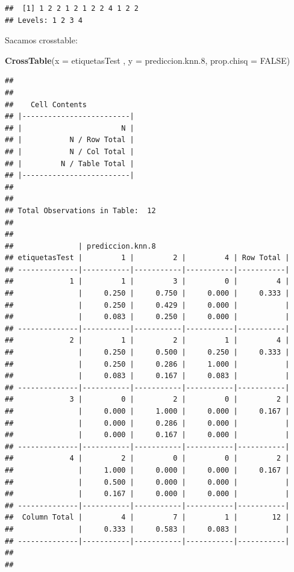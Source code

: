 \documentclass[]{article}
\newenvironment{Shaded}{\begin{snugshade}}{\end{snugshade}}
\newcommand{\KeywordTok}[1]{\textcolor[rgb]{0.13,0.29,0.53}{\textbf{#1}}}
\newcommand{\DataTypeTok}[1]{\textcolor[rgb]{0.13,0.29,0.53}{#1}}
\newcommand{\DecValTok}[1]{\textcolor[rgb]{0.00,0.00,0.81}{#1}}
\newcommand{\OtherTok}[1]{\textcolor[rgb]{0.56,0.35,0.01}{#1}}
\newcommand{\NormalTok}[1]{#1}
\begin{document}
\begin{verbatim}
##  [1] 1 2 2 1 2 1 2 2 4 1 2 2
## Levels: 1 2 3 4
\end{verbatim}

Sacamos crosstable:

\begin{Shaded}
\begin{Highlighting}[]
\KeywordTok{CrossTable}\NormalTok{(}\DataTypeTok{x =}\NormalTok{ etiquetasTest , }\DataTypeTok{y =}\NormalTok{ prediccion.knn.}\DecValTok{8}\NormalTok{, }\DataTypeTok{prop.chisq =} \OtherTok{FALSE}\NormalTok{)}
\end{Highlighting}
\end{Shaded}

\begin{verbatim}
## 
##  
##    Cell Contents
## |-------------------------|
## |                       N |
## |           N / Row Total |
## |           N / Col Total |
## |         N / Table Total |
## |-------------------------|
## 
##  
## Total Observations in Table:  12 
## 
##  
##               | prediccion.knn.8 
## etiquetasTest |         1 |         2 |         4 | Row Total | 
## --------------|-----------|-----------|-----------|-----------|
##             1 |         1 |         3 |         0 |         4 | 
##               |     0.250 |     0.750 |     0.000 |     0.333 | 
##               |     0.250 |     0.429 |     0.000 |           | 
##               |     0.083 |     0.250 |     0.000 |           | 
## --------------|-----------|-----------|-----------|-----------|
##             2 |         1 |         2 |         1 |         4 | 
##               |     0.250 |     0.500 |     0.250 |     0.333 | 
##               |     0.250 |     0.286 |     1.000 |           | 
##               |     0.083 |     0.167 |     0.083 |           | 
## --------------|-----------|-----------|-----------|-----------|
##             3 |         0 |         2 |         0 |         2 | 
##               |     0.000 |     1.000 |     0.000 |     0.167 | 
##               |     0.000 |     0.286 |     0.000 |           | 
##               |     0.000 |     0.167 |     0.000 |           | 
## --------------|-----------|-----------|-----------|-----------|
##             4 |         2 |         0 |         0 |         2 | 
##               |     1.000 |     0.000 |     0.000 |     0.167 | 
##               |     0.500 |     0.000 |     0.000 |           | 
##               |     0.167 |     0.000 |     0.000 |           | 
## --------------|-----------|-----------|-----------|-----------|
##  Column Total |         4 |         7 |         1 |        12 | 
##               |     0.333 |     0.583 |     0.083 |           | 
## --------------|-----------|-----------|-----------|-----------|
## 
## 
\end{verbatim}
\end{document}
